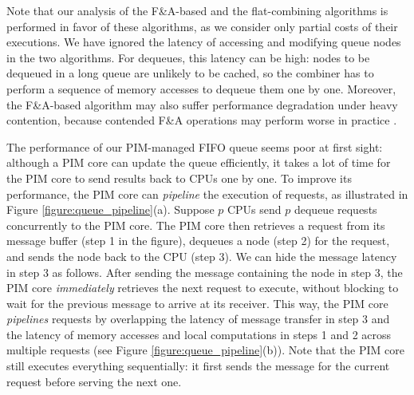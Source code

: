 Note that our analysis of the F\&A-based and the flat-combining algorithms is performed in favor of these 
algorithms, 
as we consider only partial costs of their executions. 
We have ignored the latency of accessing and modifying queue nodes in the two algorithms. 
For dequeues, this latency can be high: nodes to be dequeued in a long queue are unlikely 
to be cached, so the combiner has to perform a sequence of memory accesses to dequeue them one by one.  
Moreover, the F\&A-based algorithm may also suffer performance degradation under heavy contention, 
because contended F\&A operations may perform worse in practice \cite{David13}.

The performance of our PIM-managed FIFO queue seems poor at first sight: although a PIM core can update 
the queue efficiently, it takes a lot of time for the PIM core to send results back to CPUs one by one. 
To improve its performance, the PIM core can \textit{pipeline} the execution of requests, 
as illustrated in Figure \ref{figure:queue_pipeline}(a). 
Suppose $p$ CPUs send $p$ dequeue requests concurrently to the PIM core. 
The PIM core then retrieves a request from its message buffer (step 1 in the figure), 
dequeues a node (step 2) for the request, and sends the node back to the CPU (step 3). 
We can hide the message latency in step 3 as follows. 
After sending the message containing the node in step 3, the PIM core \emph{immediately} retrieves the next 
request to execute, without blocking to wait for the previous message to arrive at its receiver. 
This way, the PIM core \emph{pipelines} requests by overlapping the latency of message transfer in step 3  
and the latency of memory accesses and local computations in steps 1 and 2 across multiple requests 
(see Figure \ref{figure:queue_pipeline}(b)). 
Note that the PIM core still executes everything sequentially: 
it first sends the message for the current request before serving the next one.

